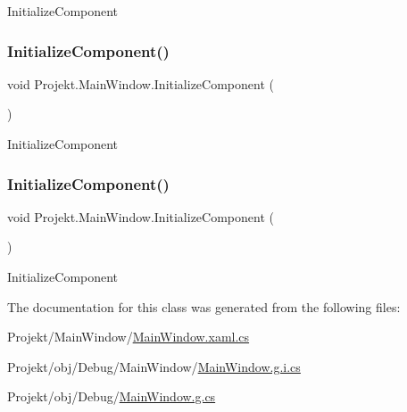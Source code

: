 Initialize\+Component 

\mbox{\label{class_projekt_1_1_main_window_a77dc8af65f12c129fb0c59a57d52f46d}} 
\subsubsection{\texorpdfstring{InitializeComponent()}{InitializeComponent()}\hspace{0.1cm}{\footnotesize\ttfamily [2/3]}}
{\footnotesize\ttfamily void Projekt.\+Main\+Window.\+Initialize\+Component (\begin{DoxyParamCaption}{ }\end{DoxyParamCaption})}



Initialize\+Component 

\mbox{\label{class_projekt_1_1_main_window_a77dc8af65f12c129fb0c59a57d52f46d}} 
\subsubsection{\texorpdfstring{InitializeComponent()}{InitializeComponent()}\hspace{0.1cm}{\footnotesize\ttfamily [3/3]}}
{\footnotesize\ttfamily void Projekt.\+Main\+Window.\+Initialize\+Component (\begin{DoxyParamCaption}{ }\end{DoxyParamCaption})}



Initialize\+Component 



The documentation for this class was generated from the following files\+:\begin{DoxyCompactItemize}
\item 
Projekt/\+Main\+Window/\mbox{\hyperlink{_main_window_8xaml_8cs}{Main\+Window.\+xaml.\+cs}}\item 
Projekt/obj/\+Debug/\+Main\+Window/\mbox{\hyperlink{_main_window_2_main_window_8g_8i_8cs}{Main\+Window.\+g.\+i.\+cs}}\item 
Projekt/obj/\+Debug/\mbox{\hyperlink{_main_window_8g_8cs}{Main\+Window.\+g.\+cs}}\end{DoxyCompactItemize}
